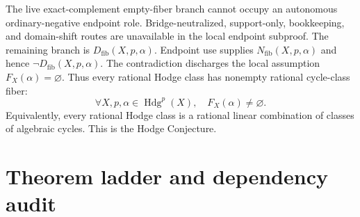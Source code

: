 \documentclass[11pt]{article}
\newcommand{\Hdg}{\operatorname{Hdg}}
\begin{document}
The live exact-complement empty-fiber branch cannot occupy an autonomous ordinary-negative endpoint role. Bridge-neutralized, support-only, bookkeeping, and domain-shift routes are unavailable in the local endpoint subproof. The remaining branch is $D_{\mathrm{fib}}(X,p,\alpha)$. Endpoint use supplies $N_{\mathrm{fib}}(X,p,\alpha)$ and hence $\neg D_{\mathrm{fib}}(X,p,\alpha)$. The contradiction discharges the local assumption $F_X(\alpha)=\varnothing$. Thus every rational Hodge class has nonempty rational cycle-class fiber:
\[
\forall X,p,\alpha\in\Hdg^p(X),\quad F_X(\alpha)\neq\varnothing.
\]
Equivalently, every rational Hodge class is a rational linear combination of classes of algebraic cycles. This is the Hodge Conjecture.


\appendix

\section{Theorem ladder and dependency audit}\label{app:theorem-ladder}
\end{document}

